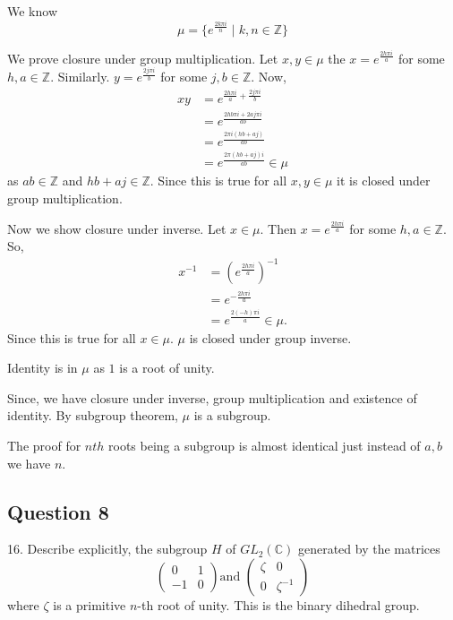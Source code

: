 \begin{solution}
  We know 
  \[ \mu  = \{e^{\frac{2k \pi i}{n} }\mid k,n \in \mathbb{Z}\}\]

  We prove closure under group multiplication. 
  Let \( x,y \in \mu  \) the \( x = e^{\frac{2h\pi i}{a}} \) for some \( h,a \in \mathbb{Z}\).
  Similarly. \( y = e^{\frac{2j\pi i}{b}} \) for some \( j,b \in \mathbb{Z} \). Now,
  \begin{align*}
    xy &= e^{\frac{2h\pi i}{a} + \frac{2j\pi i}{b}} \\
    &= e^{\frac{2hb\pi i + 2aj\pi i}{ab}} \\
    &= e^{\frac{2\pi i \left( hb + aj \right)}{ab}} \\
    &= e^{\frac{2\pi\left( hb + aj \right) i }{ab}} \in \mu 
  \end{align*}
  as \( ab \in \mathbb{Z} \) and \(  hb + aj \in \mathbb{Z} \). Since this is true for all \( x,y \in \mu  \) it is
  closed under group multiplication.

  Now we show closure under inverse. Let \( x \in \mu  \). Then
  \( x = e^{\frac{2h \pi i}{a}} \) for some \( h, a \in \mathbb{Z} \). So,
  \begin{align*}
    x^{-1} &= (e^{\frac{2 h \pi i}{a}})^{-1} \\
    &= e^{-\frac{2h \pi i}{a}} \\
    &= e^{\frac{2(-h) \pi i}{a}} \in \mu 
  .\end{align*}
  Since this is true for all \( x \in \mu  \). \( \mu  \) is closed under group inverse.

  Identity is in \( \mu  \) as \( 1  \) is a root of unity.

  Since, we have closure under inverse, group multiplication and existence of identity. By subgroup theorem, \( \mu  \) is a subgroup.

  The proof for \( nth \) roots being a subgroup is almost identical  just instead of \( a, b   \)    we have \( n \).
\end{solution}

\subsection{Question 8}
16. Describe explicitly, the subgroup \( H \) of \( GL_{2} \left( \mathbb{C} \right) \) generated by the matrices
\[
  \begin{pmatrix} 0 & 1 \\
    -1 & 0 
    \end{pmatrix}   \text{and }\begin{pmatrix} \zeta & 0 \\
                  0 & \zeta^{-1}
  \end{pmatrix} 
\] 
where \( \zeta  \) is a primitive \( n \)-th root of unity. This is the binary dihedral group.

\begin{solution}
  
\end{solution}


